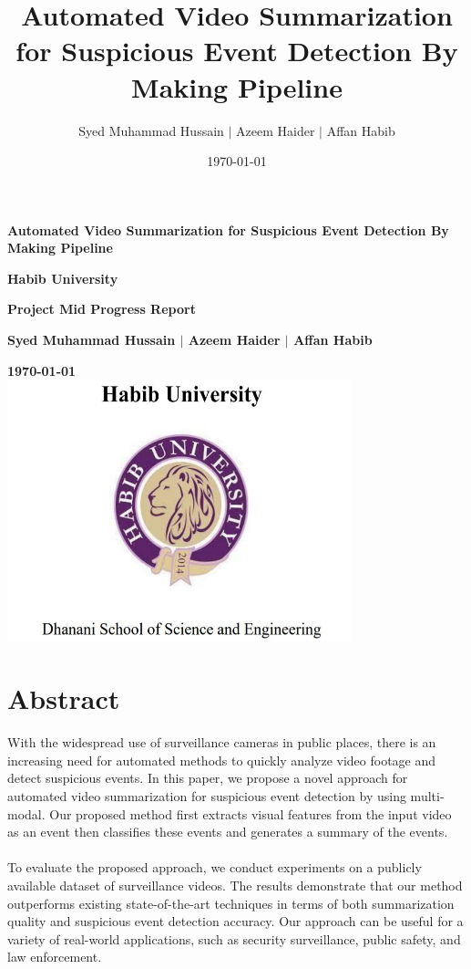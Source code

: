 \documentclass[title page]{article}
\title{Automated Video Summarization for Suspicious Event Detection By Making Pipeline}
\author{Syed Muhammad Hussain $\mid$ Azeem Haider $\mid$ Affan Habib}
\date{\today}
\newcommand{\institute}{Habib University}
\begin{document}
\begin{titlepage}
\begin{center}
\vspace*{1cm}
\Large
\textbf{Automated Video Summarization for Suspicious Event Detection By Making Pipeline}

\vspace{0.5cm}
\textbf{\institute}

\vspace{0.5cm}
\textbf{Project Mid Progress Report}

\vspace{1.5cm}
\textbf{Syed Muhammad Hussain $\mid$ Azeem Haider $\mid$ Affan Habib}

\vspace{0.5cm}
\textbf{\today} 
\\ 
\includegraphics[width=10cm]{LOGOHABIB.png} \\

\vfill
\end{center}
\end{titlepage}

\tableofcontents

\newpage

\section{Abstract}

With the widespread use of surveillance cameras in public places, there is an increasing need for automated methods to quickly analyze video footage and detect suspicious events. In this paper, we propose a novel approach for automated video summarization for suspicious event detection by using multi-modal. Our proposed method first extracts visual features from the input video as an event then classifies these events and generates a summary of the events. 
\\ \\
To evaluate the proposed approach, we conduct experiments on a publicly available dataset of surveillance videos. The results demonstrate that our method outperforms existing state-of-the-art techniques in terms of both summarization quality and suspicious event detection accuracy. Our approach can be useful for a variety of real-world applications, such as security surveillance, public safety, and law enforcement.
\end{document}
